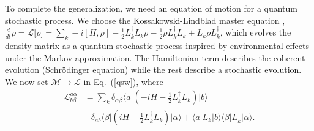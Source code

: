 \documentclass[11pt,oneside,final]{huthesis}%
\begin{document}
To complete the generalization, we need an equation of motion for a
quantum stochastic process. We choose the Kossakowski-Lindblad master
equation \cite{Kossakowski72,Lindblad76,Gorini76},
$\frac{d}{dt}\rho= \mathcal{L}\big[ \rho \big]=\sum_k-i\left[H,\rho
\right]- \frac{1}{2}L_k^\dagger L_k\rho-\frac{1}{2}\rho L_k^\dagger
L_k+L_k \rho L_k^\dagger$, which evolves the density matrix as a
quantum stochastic process inspired by environmental effects under the
Markov approximation.  The Hamiltonian term describes the coherent
evolution (Schr\"odinger equation) while the rest describe a
stochastic evolution. We now set
$\mathcal{M}\rightarrow \mathcal{L}$ in Eq.~(\ref{qsw}), where
\begin{align}\label{kossak}
\mathcal{L}^{a\alpha}_{b\beta}
&= \sum_k\delta_{\alpha\beta} \langle a \vert \left( -iH-\frac{1}{2}L_k^\dagger L_k\right) \vert b \rangle \\
&+\delta_{ab} \langle \beta \vert \left( iH-\frac{1}{2}L_k^\dagger L_k\right) \vert \alpha \rangle
+ \langle a \vert L_k \vert b \rangle \langle \beta \vert L_k^\dagger \vert \alpha \rangle. \nonumber
\end{align}
\end{document}
